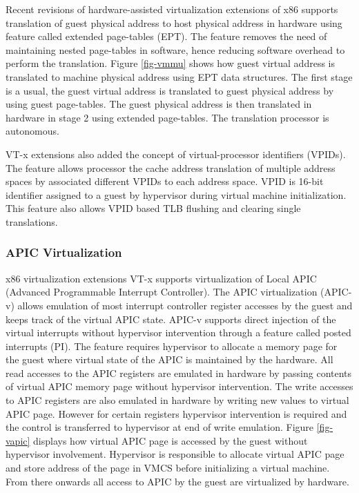 

Recent revisions of hardware-assisted virtualization extensions of x86 supports translation of guest physical address to host physical address 
in hardware using feature called extended page-tables (EPT). 
The feature removes the need of maintaining nested page-tables in software, hence reducing software overhead to perform the translation.
Figure \ref{fig-vmmu} shows how guest virtual address is translated to machine physical address using EPT data structures.
The first stage is a usual, the guest virtual address is translated to guest physical address by using guest page-tables.
The guest physical address is then translated in hardware in stage 2 using extended page-tables. The translation processor is
autonomous.

VT-x extensions also added the concept of virtual-processor identifiers (VPIDs). 
The feature allows processor the cache address translation of multiple address spaces by associated different VPIDs to each address space.
VPID is 16-bit identifier assigned to a guest by hypervisor during virtual machine initialization.
This feature also allows VPID based TLB flushing and clearing single translations.

\subsubsection{APIC Virtualization} \label{sec:vapic}
x86 virtualization extensions VT-x supports virtualization of Local APIC (Advanced Programmable Interrupt Controller). 
The APIC virtualization (APIC-v) allows emulation of most interrupt controller register accesses by the guest and keeps track of the virtual APIC state. 
APIC-v supports direct injection of the virtual interrupts without hypervisor intervention through a feature called posted interrupts (PI).
The feature requires hypervisor to allocate a memory page for the guest where virtual state of the APIC is maintained by the hardware.
All read accesses to the APIC registers are emulated in hardware by passing contents of virtual APIC memory page without hypervisor intervention.
The write accesses to APIC registers are also emulated in hardware by writing new values to virtual APIC page. 
However for certain registers hypervisor intervention is required and the control is transferred to hypervisor at end of write emulation.
Figure \ref{fig-vapic} displays how virtual APIC page is accessed by the guest without hypervisor involvement. 
Hypervisor is responsible to allocate virtual APIC page and store address of the page in VMCS before initializing a virtual machine.
From there onwards all access to APIC by the guest are virtualized by hardware.

